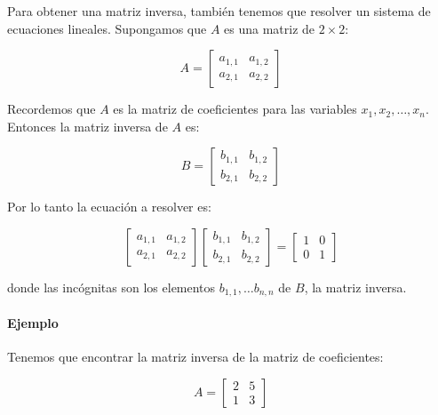 \documentclass[
]{book}
\begin{document}
Para obtener una matriz inversa, también tenemos que resolver un sistema de ecuaciones lineales. Supongamos que \(A\) es una matriz de \(2 \times 2\):

\begin{equation}
A = \left[\begin{array}{ccc}
a_{1, 1} & a_{1, 2} \\
a_{2, 1} & a_{2, 2}
\end{array}
\right]
\end{equation}

Recordemos que \(A\) es la matriz de coeficientes para las variables \(x_1, x_2, \dots, x_n\). Entonces la matriz inversa de \(A\) es:

\begin{equation}
B = \left[\begin{array}{ccc}
b_{1, 1} & b_{1, 2} \\
b_{2, 1} & b_{2, 2}
\end{array}
\right]
\end{equation}

Por lo tanto la ecuación a resolver es:

\begin{equation}
\left[\begin{array}{ccc}
a_{1, 1} & a_{1, 2} \\
a_{2, 1} & a_{2, 2}
\end{array}
\right]
\left[\begin{array}{ccc}
b_{1, 1} & b_{1, 2} \\
b_{2, 1} & b_{2, 2}
\end{array}
\right] =
\left[\begin{array}{ccc}
1 & 0 \\
0 & 1
\end{array}
\right]
\end{equation}

donde las incógnitas son los elementos \(b_{1,1}, \dots b_{n,n}\) de \(B\), la matriz inversa.

\hypertarget{ejemplo-1}{%
\paragraph{Ejemplo}\label{ejemplo-1}}

Tenemos que encontrar la matriz inversa de la matriz de coeficientes:

\begin{equation}
A =
\left[\begin{array}{ccc}
2 & 5 \\
1 & 3
\end{array}
\right]
\end{equation}
\end{document}
